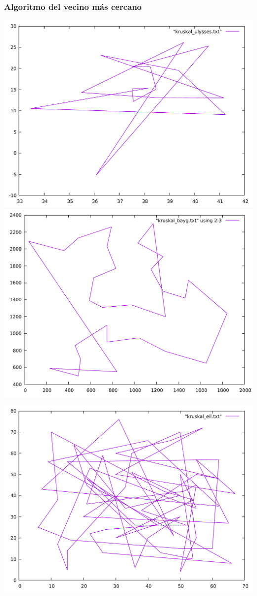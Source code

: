 \documentclass[13pt]{beamer}
\begin{document}
	\begin{frame}
		\frametitle{Algoritmo del vecino más cercano}
			\includegraphics[scale=0.2]{../src/kruskal_ulysses.pdf}
			\includegraphics[scale=0.2]{../src/kruskal_bayg.pdf}
			\begin{center}
				\includegraphics[scale=0.2]{../src/kruskal_eil.pdf}
			\end{center}
	\end{frame}
\end{document}

